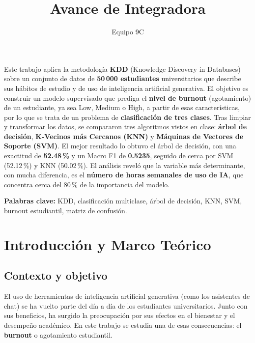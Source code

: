\documentclass[11pt,letterpaper,twoside]{article}
\title{Avance de Integradora}
\author{Equipo 9C}
\begin{document}
\parindent=0mm

\newpage

\setcounter{page}{1}

\begin{tcolorbox}[
    enhanced,
    colback=fondoclaro,
    colframe=azulutez,
    coltitle=white,
    fonttitle=\large\bfseries,
    title=Resumen,
    boxrule=1.5pt,
    arc=3mm,
    left=10pt,
    right=10pt,
    top=8pt,
    bottom=8pt
]
\noindent Este trabajo aplica la metodología \textbf{KDD} (Knowledge Discovery in Databases) sobre un conjunto de datos de \textbf{50\,000 estudiantes} universitarios que describe sus hábitos de estudio y de uso de inteligencia artificial generativa. El objetivo es construir un modelo supervisado que prediga el \textbf{nivel de burnout} (agotamiento) de un estudiante, ya sea Low, Medium o High, a partir de esas características, por lo que se trata de un problema de \textbf{clasificación de tres clases}. Tras limpiar y transformar los datos, se compararon tres algoritmos vistos en clase: \textbf{árbol de decisión}, \textbf{K-Vecinos más Cercanos (KNN)} y \textbf{Máquinas de Vectores de Soporte (SVM)}. El mejor resultado lo obtuvo el árbol de decisión, con una exactitud de \textbf{52.48\,\%} y un Macro F1 de \textbf{0.5235}, seguido de cerca por SVM (52.12\,\%) y KNN (50.02\,\%). El análisis reveló que la variable más determinante, con mucha diferencia, es el \textbf{número de horas semanales de uso de IA}, que concentra cerca del 80\,\% de la importancia del modelo.

\vspace{0.4cm}
\textcolor{azulutez}{\textbf{Palabras clave:}} KDD, clasificación multiclase, árbol de decisión, KNN, SVM, burnout estudiantil, matriz de confusión.
\end{tcolorbox}
\newpage

\renewcommand{\contentsname}{Índice}
\tableofcontents
\newpage

\setcounter{page}{1}

\section{Introducción y Marco Teórico}
\label{sec:introduccion}

\subsection{Contexto y objetivo}
El uso de herramientas de inteligencia artificial generativa (como los asistentes de chat) se ha vuelto parte del día a día de los estudiantes universitarios. Junto con sus beneficios, ha surgido la preocupación por sus efectos en el bienestar y el desempeño académico. En este trabajo se estudia una de esas consecuencias: el \textbf{burnout} o agotamiento estudiantil.
\end{document}
